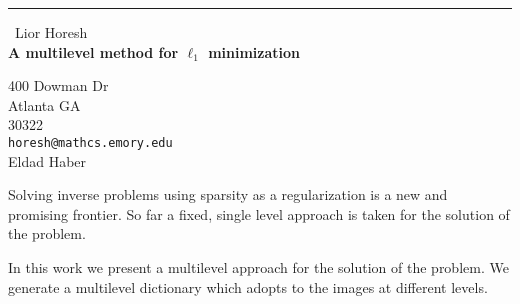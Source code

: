 \documentclass{report}
\begin{document}
\begin{center}
\rule{6in}{1pt} \
{\large Lior Horesh \\
{\bf A multilevel method for $\ell_1$ minimization}}

400 Dowman Dr \\ Atlanta GA \\ 30322
\\
{\tt horesh@mathcs.emory.edu}\\
Eldad Haber\end{center}

Solving inverse problems using sparsity as a regularization
is a new and promising frontier.
So far a fixed, single level approach is taken for
the solution of the problem.

In this work we present a multilevel approach for the
solution of the problem. We generate a multilevel dictionary
which adopts to the images at different levels.
\end{document}
